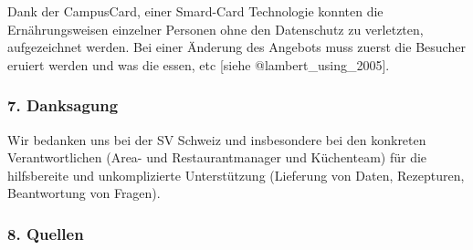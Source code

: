 \documentclass[12pt,ngerman,]{article}
\begin{document}
Dank der CampusCard, einer Smard-Card Technologie konnten die
Ernährungsweisen einzelner Personen ohne den Datenschutz zu verletzten,
aufgezeichnet werden. Bei einer Änderung des Angebots muss zuerst die
Besucher eruiert werden und was die essen, etc {[}siehe
@lambert\_using\_2005{]}.

\hypertarget{danksagung}{%
\subsubsection{7. Danksagung}\label{danksagung}}

Wir bedanken uns bei der SV Schweiz und insbesondere bei den konkreten
Verantwortlichen (Area- und Restaurantmanager und Küchenteam) für die
hilfsbereite und unkomplizierte Unterstützung (Lieferung von Daten,
Rezepturen, Beantwortung von Fragen).

\hypertarget{quellen}{%
\subsubsection{8. Quellen}\label{quellen}}
\end{document}

